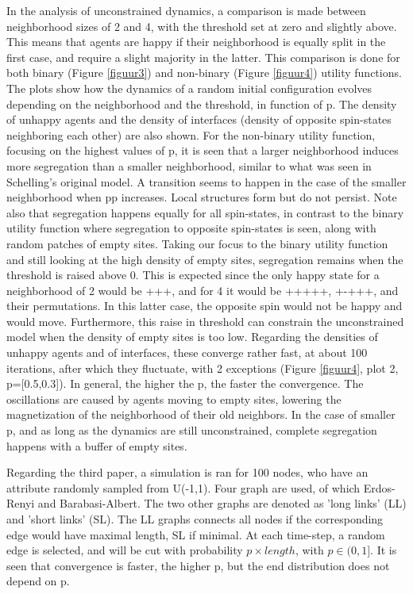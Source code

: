 In the analysis of unconstrained dynamics, a comparison is made between neighborhood sizes of 2 and 4, with the threshold set at zero and slightly above. This means that agents are happy if their neighborhood is equally split in the first case, and require a slight majority in the latter. This comparison is done for both binary (Figure \ref{figuur3}) and non-binary (Figure \ref{figuur4}) utility functions. The plots show how the dynamics of a random initial configuration evolves depending on the neighborhood and the threshold, in function of p. The density of unhappy agents and the density of interfaces (density of opposite spin-states neighboring each other) are also shown.
For the non-binary utility function, focusing on the highest values of p, it is seen that a larger neighborhood induces more segregation than a smaller neighborhood, similar to what was seen in Schelling's original model. A transition seems to happen in the case of the smaller neighborhood when pp increases. Local structures form but do not persist. Note also that segregation happens equally for all spin-states, in contrast to the binary utility function where segregation to opposite spin-states is seen, along with random patches of empty sites.
Taking our focus to the binary utility function and still looking at the high density of empty sites, segregation remains when the threshold is raised above 0. This is expected since the only happy state for a neighborhood of 2 would be +++, and for 4 it would be +++++, +-+++, and their permutations. In this latter case, the opposite spin would not be happy and would move. Furthermore, this raise in threshold can constrain the unconstrained model when the density of empty sites is too low.
Regarding the densities of unhappy agents and of interfaces, these converge rather fast, at about 100 iterations, after which they fluctuate, with 2 exceptions (Figure \ref{figuur4}, plot 2, p=[0.5,0.3]). In general, the higher the p, the faster the convergence. 
The oscillations are caused by agents moving to empty sites, lowering the magnetization of the neighborhood of their old neighbors.
In the case of smaller p, and as long as the dynamics are still unconstrained, complete segregation happens with a buffer of empty sites.


Regarding the third paper, a simulation is ran for 100 nodes, who have an attribute randomly sampled from U(-1,1). Four graph are used, of which Erdos-Renyi and Barabasi-Albert. The two other graphs are denoted as 'long links' (LL) and 'short links' (SL). The LL graphs connects all nodes if the corresponding edge would have maximal length, SL if minimal. At each time-step, a random edge is selected, and will be cut with probability $p\times length$, with $p\in (0,1]$. It is seen that convergence is faster, the higher p, but the end distribution does not depend on p. 



